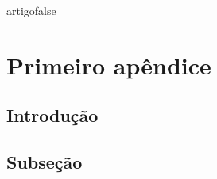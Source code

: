 artigofalse
\chapter{Primeiro apêndice}
\label{anex:apendiceA}

\tocless\section{Introdução}

\blindtext[2]

\tocless\section{Subseção}

\blindtext[2]
